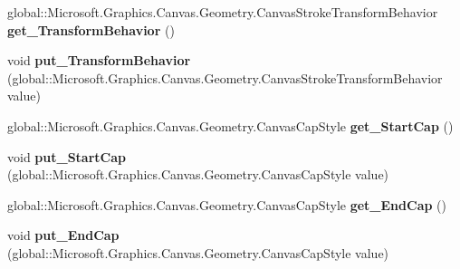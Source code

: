 \begin{DoxyCompactItemize}
global\+::\+Microsoft.\+Graphics.\+Canvas.\+Geometry.\+Canvas\+Stroke\+Transform\+Behavior {\bfseries get\+\_\+\+Transform\+Behavior} ()
\item 
\mbox{\label{interface_microsoft_1_1_graphics_1_1_canvas_1_1_geometry_1_1_i_canvas_stroke_style_ac482e23f3ef5eebc025715899d1deb51}} 
void {\bfseries put\+\_\+\+Transform\+Behavior} (global\+::\+Microsoft.\+Graphics.\+Canvas.\+Geometry.\+Canvas\+Stroke\+Transform\+Behavior value)
\item 
\mbox{\label{interface_microsoft_1_1_graphics_1_1_canvas_1_1_geometry_1_1_i_canvas_stroke_style_a23f30b5c717e10b15ce38fa7d3721e03}} 
global\+::\+Microsoft.\+Graphics.\+Canvas.\+Geometry.\+Canvas\+Cap\+Style {\bfseries get\+\_\+\+Start\+Cap} ()
\item 
\mbox{\label{interface_microsoft_1_1_graphics_1_1_canvas_1_1_geometry_1_1_i_canvas_stroke_style_a2fdd3aee781a3fb799081a2ec567b732}} 
void {\bfseries put\+\_\+\+Start\+Cap} (global\+::\+Microsoft.\+Graphics.\+Canvas.\+Geometry.\+Canvas\+Cap\+Style value)
\item 
\mbox{\label{interface_microsoft_1_1_graphics_1_1_canvas_1_1_geometry_1_1_i_canvas_stroke_style_aab45339696dfcadb0ae0eb8e89bb68e4}} 
global\+::\+Microsoft.\+Graphics.\+Canvas.\+Geometry.\+Canvas\+Cap\+Style {\bfseries get\+\_\+\+End\+Cap} ()
\item 
\mbox{\label{interface_microsoft_1_1_graphics_1_1_canvas_1_1_geometry_1_1_i_canvas_stroke_style_aef264fbe0fcf18df425b8904ea4dca31}} 
void {\bfseries put\+\_\+\+End\+Cap} (global\+::\+Microsoft.\+Graphics.\+Canvas.\+Geometry.\+Canvas\+Cap\+Style value)
\item 
\mbox{\label{interface_microsoft_1_1_graphics_1_1_canvas_1_1_geometry_1_1_i_canvas_stroke_style_a6460321748d903188a3fd0c96b9309df}} 

\end{DoxyCompactItemize}
